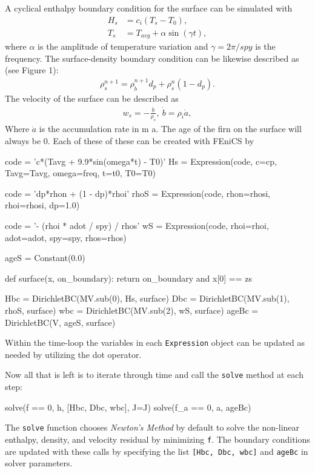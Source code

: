A cyclical enthalpy boundary condition for the surface can be simulated with 
\begin{align*}
    H_s &= c_i ( T_s - T_0 ),\\
    T_s &= T_{avg} + \alpha \sin(\gamma t),
\end{align*}
where $\alpha$ is the amplitude of temperature variation and $\gamma = 2\pi / spy$ is the frequency.  The surface-density boundary condition can be likewise described as (see Figure 1): 
\begin{align*}
    \rho_s^{n+1} = \rho_{\dot{b}}^{n+1} d_p + \rho_s^{n} (1 - d_p).
\end{align*}
The velocity of the surface can be described as 
\begin{align*}
  w_s = -\frac{\dot{b}}{\rho_s},\ \dot{b} = \rho_i \dot{a},
\end{align*}
Where $\dot{a}$ is the accumulation rate in m a.
The age of the firn on the surface will always be 0.
Each of these of these can be created with FEniCS by
\begin{python}
code = 'c*(Tavg + 9.9*sin(omega*t) - T0)'
Hs   = Expression(code, c=cp, Tavg=Tavg, 
                  omega=freq, t=t0, T0=T0)

code = 'dp*rhon + (1 - dp)*rhoi'
rhoS = Expression(code, rhon=rhosi, 
                  rhoi=rhosi, dp=1.0)

code   = '- (rhoi * adot / spy) / rhos'
wS     = Expression(code, rhoi=rhoi, 
                    adot=adot, spy=spy, 
                    rhos=rhos)

ageS   = Constant(0.0)

def surface(x, on_boundary):
  return on_boundary and x[0] == zs

Hbc   = DirichletBC(MV.sub(0), Hs,   surface)
Dbc   = DirichletBC(MV.sub(1), rhoS, surface)
wbc   = DirichletBC(MV.sub(2), wS,   surface)
ageBc = DirichletBC(V,         ageS, surface)
\end{python}
Within the time-loop the variables in each \texttt{Expression} object can be updated as needed by utilizing the dot operator.

Now all that is left is to iterate through time and call the \texttt{solve} method at each step:\par
\begin{python}
solve(f == 0, h, [Hbc, Dbc, wbc], J=J)
solve(f_a == 0, a, ageBc)
\end{python}
The \texttt{solve} function chooses \emph{Newton's Method} by default to solve the non-linear enthalpy, density, and velocity residual by minimizing \texttt{f}.  The boundary conditions are updated with these calls by specifying the list \texttt{[Hbc, Dbc, wbc]} and \texttt{ageBc} in solver parameters.

